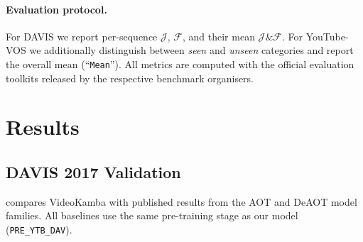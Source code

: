 \documentclass[11pt,a4paper]{article}
\begin{document}
\paragraph{Evaluation protocol.}
For DAVIS we report per-sequence $\mathcal{J}$, $\mathcal{F}$, and their mean
$\mathcal{J}\&\mathcal{F}$.  For YouTube-VOS we additionally distinguish
between \emph{seen} and \emph{unseen} categories and report the overall mean
(``\texttt{Mean}'').  All metrics are computed with the official evaluation
toolkits released by the respective benchmark organisers.

\section{Results}
\label{sec:results}

\subsection{DAVIS 2017 Validation}
\label{sec:davis}

 compares VideoKamba with published results from the AOT and
DeAOT model families.  All baselines use the same pre-training stage as our
model (\texttt{PRE\_YTB\_DAV}).
\end{document}
